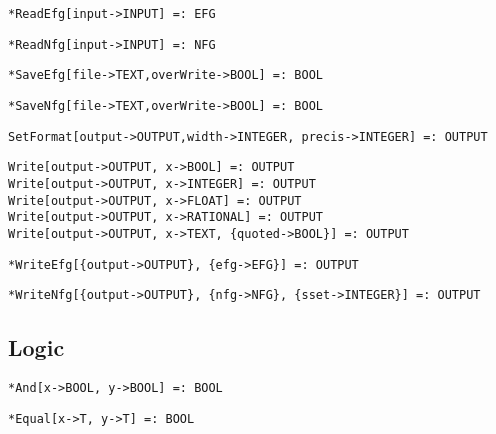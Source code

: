 \protect \large \begin{verbatim}
*ReadEfg[input->INPUT] =: EFG
\end{verbatim}\normalsize

\protect \large \begin{verbatim}
*ReadNfg[input->INPUT] =: NFG
\end{verbatim}\normalsize

\protect \large \begin{verbatim}
*SaveEfg[file->TEXT,overWrite->BOOL] =: BOOL
\end{verbatim}\normalsize

\protect \large \begin{verbatim}
*SaveNfg[file->TEXT,overWrite->BOOL] =: BOOL
\end{verbatim}\normalsize

\protect \large \begin{verbatim}
SetFormat[output->OUTPUT,width->INTEGER, precis->INTEGER] =: OUTPUT
\end{verbatim}\normalsize


\protect \large \begin{verbatim}
Write[output->OUTPUT, x->BOOL] =: OUTPUT 
Write[output->OUTPUT, x->INTEGER] =: OUTPUT
Write[output->OUTPUT, x->FLOAT] =: OUTPUT
Write[output->OUTPUT, x->RATIONAL] =: OUTPUT
Write[output->OUTPUT, x->TEXT, {quoted->BOOL}] =: OUTPUT
\end{verbatim}\normalsize


\protect \large \begin{verbatim}
*WriteEfg[{output->OUTPUT}, {efg->EFG}] =: OUTPUT
\end{verbatim}\normalsize


\protect \large \begin{verbatim}
*WriteNfg[{output->OUTPUT}, {nfg->NFG}, {sset->INTEGER}] =: OUTPUT
\end{verbatim}\normalsize



\medskip
\subsection{Logic}

\protect \large \begin{verbatim}
*And[x->BOOL, y->BOOL] =: BOOL
\end{verbatim} \normalsize


\protect \large \begin{verbatim}
*Equal[x->T, y->T] =: BOOL
\end{verbatim}\normalsize


